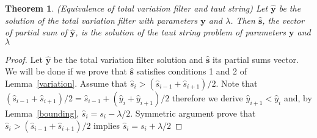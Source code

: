 \documentclass{article}
\newtheorem{theorem}{Theorem}[section]
\theoremstyle{definition}
\def\*#1{\mathbf{#1}}
\begin{document}
\begin{theorem}{(Equivalence of total variation filter and taut string)}
  Let $\hat{\*y}$ be the solution of the total variation filter with parameters $\*y$ and $\lambda$. Then $\hat{\*s}$, the vector of partial sum of $\hat{\*y}$, is the solution of the taut string problem of parameters $\*y$ and $\lambda$
\end{theorem}
\begin{proof}
  Let $\hat{\*y}$ be the total variation filter solution and $\hat{\*s}$ its partial sums vector.
  We will be done if we prove that $\hat{\*s}$ satisfies conditions 1 and 2 of Lemma~\ref{variation}.
  Assume that $\hat{s}_i > (\hat{s}_{i-1} + \hat{s}_{i + 1})/2$. Note that $(\hat{s}_{i-1} + \hat{s}_{i + 1})/2 = \hat{s}_{i-1} + (\hat{y}_i + \hat{y}_{i+1})/2$ therefore we derive $\hat{y}_{i+1} < \hat{y}_i$ and, by Lemma~\ref{bounding}, $\hat{s}_{i} = s_i - \lambda/2$. Symmetric argument prove that $\hat{s}_i > (\hat{s}_{i-1} + \hat{s}_{i + 1})/2$ implies $\hat{s}_{i} = s_i + \lambda/2$
\end{proof}
  
\end{document}
